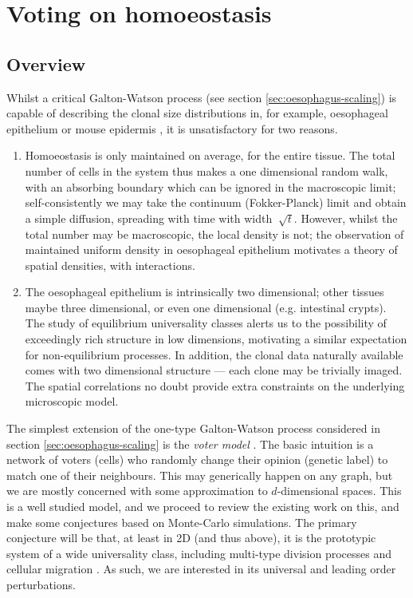 \documentclass[10pt,english]{report}
\begin{document}
\chapter{\label{ch:voter}Voting on homoeostasis}

\section{Overview}

Whilst a critical Galton-Watson process (see section \ref{sec:oesophagus-scaling}) is capable of describing the clonal size distributions in, for example, oesophageal epithelium or mouse epidermis  \citep{klein07}, it is unsatisfactory for two reasons.

\begin{enumerate}
\item Homoeostasis is only maintained on average, for the entire tissue. The total number of cells in the system thus makes a one dimensional random walk, with an absorbing boundary which can be ignored in the macroscopic limit; self-consistently we may take the continuum (Fokker-Planck) limit and obtain a simple diffusion, spreading with time with width $~\sqrt{t}$. However, whilst the total number may be macroscopic, the local density is not; the observation of maintained uniform density in oesophageal epithelium motivates a theory of spatial densities, with interactions.

\item The oesophageal epithelium is intrinsically two dimensional; other tissues maybe three dimensional, or even one dimensional (e.g. intestinal crypts). The study of equilibrium universality classes alerts us to the possibility of exceedingly rich structure in low dimensions, motivating a similar expectation for non-equilibrium processes. In addition, the clonal data naturally available comes with two dimensional structure --- each clone may be trivially imaged. The spatial correlations no doubt provide extra constraints on the underlying microscopic model.

\end{enumerate}

The simplest extension of the one-type Galton-Watson process considered in section \ref{sec:oesophagus-scaling} is the \emph{voter model} \citep[][chapter V]{liggettbook}. The basic intuition is a network of voters (cells) who randomly change their opinion (genetic label) to match one of their neighbours. This may generically happen on any graph, but we are mostly concerned with some approximation to $d$-dimensional spaces. This is a well studied model, and we proceed to review the existing work on this, and make some conjectures based on Monte-Carlo simulations. The primary conjecture will be that, at least in 2D (and thus above), it is the prototypic system of a wide universality class, including multi-type division processes and cellular migration \citep{klein08}. As such, we are interested in its universal and leading order perturbations.
\end{document}
